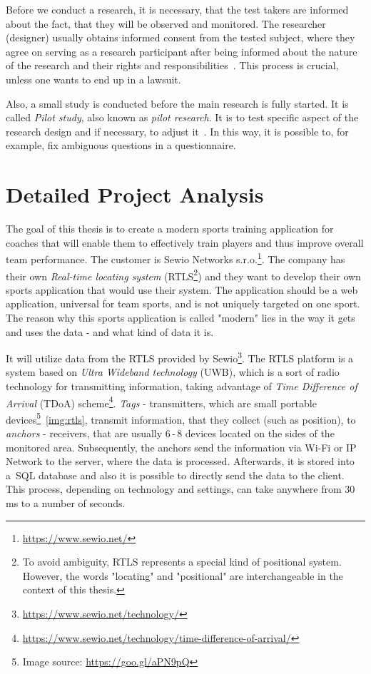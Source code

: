 \bigskip
Before we conduct a research, it is necessary, that the test takers are informed about the fact, that they will be observed and monitored. The researcher (designer) usually obtains informed consent from the tested subject, where they agree on serving as a research participant after being informed about the nature of the research and their rights and responsibilities~\cite{Bordens}. This process is crucial, unless one wants to end up in a lawsuit.

Also, a small study is conducted before the main research is fully started. It is called \textit{Pilot study}, also known as \textit{pilot research}. It is to test specific aspect of the research design and if necessary, to adjust it~\cite{AQR}. In this way, it is possible to, for example, fix ambiguous questions in a questionnaire.

\section{Detailed Project Analysis}
The goal of this thesis is to create a modern sports training application for coaches that will enable them to effectively train players and thus improve overall team performance. The customer is Sewio Networks s.r.o.\footnote{\url{https://www.sewio.net/}}. The company has their own \textit{Real-time locating system} (RTLS\footnote{To avoid ambiguity, RTLS represents a special kind of positional system. However, the words "locating" and "positional" are interchangeable in the context of this thesis.}) and they want to develop their own sports application that would use their system. The application should be a web application, universal for team sports, and is not uniquely targeted on one sport. The reason why this sports application is called "modern" lies in the way it gets and uses the data - and what kind of data it is.

It will utilize data from the RTLS provided by Sewio\footnote{\url{https://www.sewio.net/technology/}}. The RTLS platform is a system based on \textit{Ultra Wideband technology} (UWB), which is a sort of radio technology for transmitting information, taking advantage of \textit{Time Difference of Arrival} (TDoA) scheme\footnote{\url{https://www.sewio.net/technology/time-difference-of-arrival/}}. \textit{Tags} - transmitters, which are small portable devices\footnote{Image source: \url{https://goo.gl/aPN9pQ}}~\ref{img:rtls}, transmit information, that they collect (such as position), to \textit{anchors} - receivers, that are usually 6\,-\,8 devices located on the sides of the monitored area. Subsequently, the anchors send the information via Wi-Fi or IP Network to the server, where the data is processed. Afterwards, it is stored into a~SQL database and also it is possible to directly send the data to the client. This process, depending on technology and settings, can take anywhere from 30\,ms to a number of seconds.

